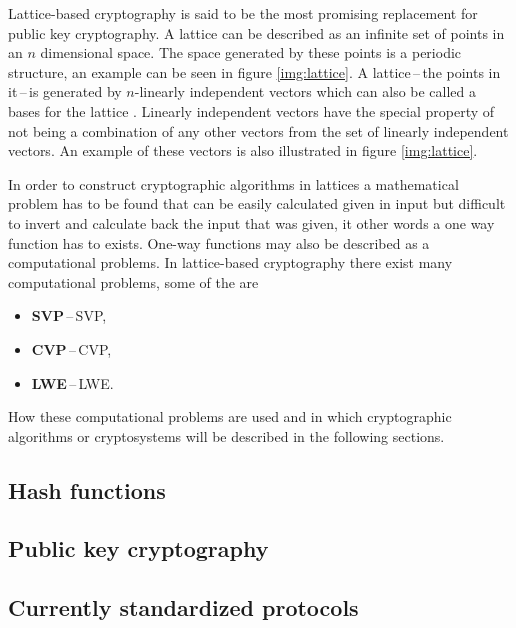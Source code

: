 Lattice-based cryptography is said to be the most promising replacement for public key cryptography. A lattice can be described as an infinite set of points in an $n$ dimensional space. The space generated by these points is a periodic structure, an example can be seen in figure \ref{img:lattice}. A lattice\,--\,the points in it\,--\,is generated by $n$-linearly independent vectors which can also be called a bases for the lattice \cite{Bernstein2009}. Linearly independent vectors have the special property of not being a combination of any other vectors from the set of linearly independent vectors. An example of these vectors is also illustrated in figure \ref{img:lattice}.


In order to construct cryptographic algorithms in lattices a mathematical problem has to be found that can be easily calculated given in input but difficult to invert and calculate back the input that was given, it other words a one way function has to exists. One-way functions may also be described as a computational problems. In lattice-based cryptography there exist many computational problems, some of the are
\begin{itemize}
  \item \textbf{SVP}\,--\,\acl{SVP},
  \item \textbf{CVP}\,--\,\acl{CVP},
  \item \textbf{LWE}\,--\,\acl{LWE}\cite{Bernstein2009}.
\end{itemize}
How these computational problems are used and in which cryptographic algorithms or cryptosystems will be described in the following sections.

\subsection{Hash functions}

\subsection{Public key cryptography}

\subsection{Currently standardized protocols}
